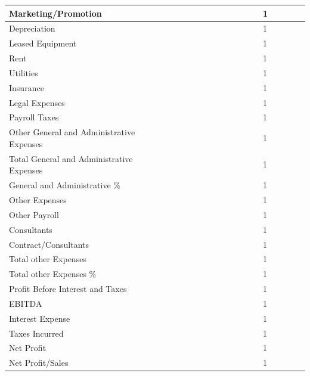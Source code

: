 \documentclass[11pt]{article}
\begin{document}
\begin{landscape}
\begin{scriptsize}
\begin{tabular}{ | l | l | l | l | l | l | l | l | l | l | l | l | l | l | l | l | l | l |}
  Marketing/Promotion & & & & & & & & & & & & & 1 \\ \hline
  Depreciation & & & & & & & & & & & & & 1 \\ \hline
  Leased Equipment & & & & & & & & & & & & & 1 \\ \hline
  Rent & & & & & & & & & & & & & 1 \\ \hline
  Utilities & & & & & & & & & & & & & 1 \\ \hline
  Insurance & & & & & & & & & & & & & 1 \\ \hline
  Legal Expenses & & & & & & & & & & & & & 1 \\ \hline
  Payroll Taxes & & & & & & & & & & & & & 1 \\ \hline
  Other General and Administrative Expenses & & & & & & & & & & & & & 1 \\ \hline
  Total General and Administrative Expenses & & & & & & & & & & & & & 1 \\ \hline
  General and Administrative \% & & & & & & & & & & & & & 1 \\ \hline
  Other Expenses & & & & & & & & & & & & & 1 \\ \hline
  Other Payroll & & & & & & & & & & & & & 1 \\ \hline
  Consultants & & & & & & & & & & & & & 1 \\ \hline
  Contract/Consultants & & & & & & & & & & & & & 1 \\ \hline
  Total other Expenses & & & & & & & & & & & & & 1 \\ \hline
  Total other Expenses \% & & & & & & & & & & & & & 1 \\ \hline
  Profit Before Interest and Taxes & & & & & & & & & & & & & 1 \\ \hline
  EBITDA & & & & & & & & & & & & & 1 \\ \hline
  Interest Expense & & & & & & & & & & & & & 1 \\ \hline
  Taxes Incurred & & & & & & & & & & & & & 1 \\ \hline
  Net Profit & & & & & & & & & & & & & 1 \\ \hline
  Net Profit/Sales & & & & & & & & & & & & & 1 \\ \hline
\end{tabular}
\end{scriptsize}
\end{landscape}
\newpage
\thispagestyle{empty}
\end{document}
